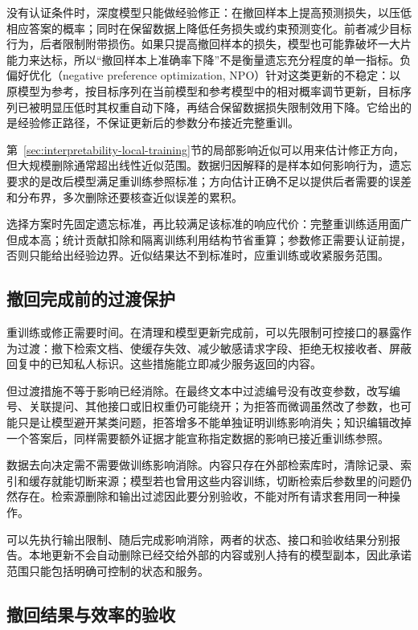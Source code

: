 没有认证条件时，深度模型只能做经验修正：在撤回样本上提高预测损失，以压低相应答案的概率；同时在保留数据上降低任务损失或约束预测变化。前者减少目标行为，后者限制附带损伤。如果只提高撤回样本的损失，模型也可能靠破坏一大片能力来达标，所以“撤回样本上准确率下降”不是衡量遗忘充分程度的单一指标。负偏好优化（negative preference optimization, NPO）针对这类更新的不稳定：以原模型为参考，按目标序列在当前模型和参考模型中的相对概率调节更新，目标序列已被明显压低时其权重自动下降，再结合保留数据损失限制效用下降。它给出的是经验修正路径，不保证更新后的参数分布接近完整重训。

第~\ref{sec:interpretability-local-training}节的局部影响近似可以用来估计修正方向，但大规模删除通常超出线性近似范围。数据归因解释的是样本如何影响行为，遗忘要求的是改后模型满足重训练参照标准；方向估计正确不足以提供后者需要的误差和分布界，多次删除还要核查近似误差的累积。

选择方案时先固定遗忘标准，再比较满足该标准的响应代价：完整重训练适用面广但成本高；统计贡献扣除和隔离训练利用结构节省重算；参数修正需要认证前提，否则只能给出经验边界。近似结果达不到标准时，应重训练或收紧服务范围。

\subsection{撤回完成前的过渡保护}
\label{sec:privacy-unlearning-output-control}

重训练或修正需要时间。在清理和模型更新完成前，可以先限制可控接口的暴露作为过渡：撤下检索文档、使缓存失效、减少敏感请求字段、拒绝无权接收者、屏蔽回复中的已知私人标识。这些措施能立即减少服务返回的内容。

但过渡措施不等于影响已经消除。在最终文本中过滤编号没有改变参数，改写编号、关联提问、其他接口或旧权重仍可能绕开；为拒答而微调虽然改了参数，也可能只是让模型避开某类问题，拒答增多不能单独证明训练影响消失；知识编辑改掉一个答案后，同样需要额外证据才能宣称指定数据的影响已接近重训练参照。

数据去向决定需不需要做训练影响消除。内容只存在外部检索库时，清除记录、索引和缓存就能切断来源；模型若也曾用这些内容训练，切断检索后参数里的问题仍然存在。检索源删除和输出过滤因此要分别验收，不能对所有请求套用同一种操作。

可以先执行输出限制、随后完成影响消除，两者的状态、接口和验收结果分别报告。本地更新不会自动删除已经交给外部的内容或别人持有的模型副本，因此承诺范围只能包括明确可控制的状态和服务。

\subsection{撤回结果与效率的验收}
\label{sec:privacy-unlearning-validation}

